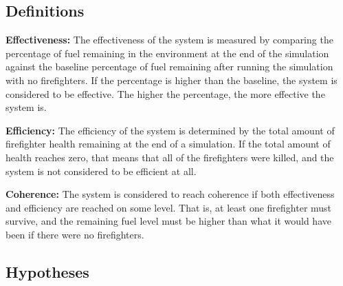 \documentclass{article}
\begin{document}
  \subsection{Definitions}
  \begin{description}
    \item \textbf{Effectiveness:}
      The effectiveness of the system is measured by comparing the percentage of
      fuel remaining in the environment at the end of the simulation against the
      baseline percentage of fuel remaining after running the simulation with no
      firefighters.  If the percentage is higher than the baseline, the system
      is considered to be effective.  The higher the percentage, the more
      effective the system is.

    \item \textbf{Efficiency:}
      The efficiency of the system is determined by the total amount of firefighter
      health remaining at the end of a simulation.  If the total amount of health
      reaches zero, that means that all of the firefighters were killed, and the
      system is not considered to be efficient at all.

    \item \textbf{Coherence:}
      The system is considered to reach coherence if both effectiveness and
      efficiency are reached on some level.  That is, at least one firefighter
      must survive, and the remaining fuel level must be higher than what it
      would have been if there were no firefighters.

  \end{description}

  \subsection{Hypotheses}
\end{document}
